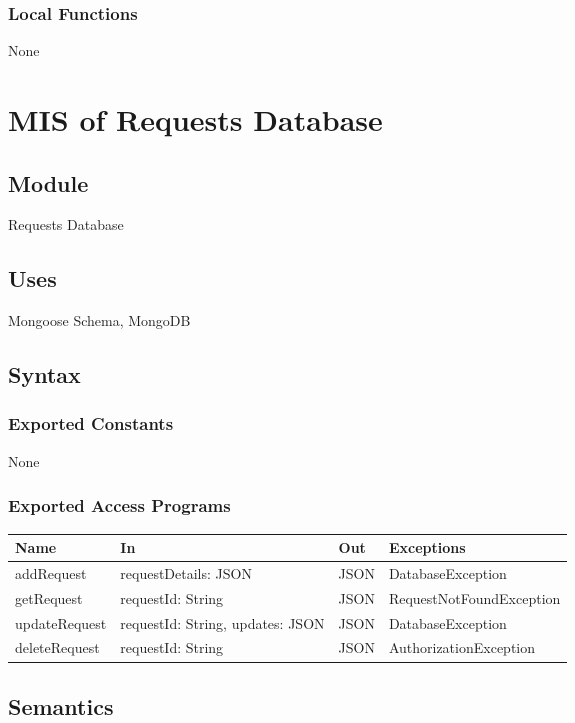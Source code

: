 \documentclass[12pt, titlepage]{article}
\begin{document}
\subsubsection{Local Functions}
None

\section{MIS of Requests Database} \label{Requests Database}

\subsection{Module}
Requests Database

\subsection{Uses}
Mongoose Schema, MongoDB

\subsection{Syntax}

\subsubsection{Exported Constants}
None

\subsubsection{Exported Access Programs}

\begin{center}
\begin{tabular}{p{4cm} p{4cm} p{2cm} p{4cm}}
\hline
\textbf{Name} & \textbf{In} & \textbf{Out} & \textbf{Exceptions} \\
\hline
addRequest & requestDetails: JSON & JSON & DatabaseException \\
getRequest & requestId: String & JSON & RequestNotFoundException \\
updateRequest & requestId: String, updates: JSON & JSON & DatabaseException \\
deleteRequest & requestId: String & JSON & AuthorizationException \\
\hline
\end{tabular}
\end{center}

\subsection{Semantics}
\end{document}
